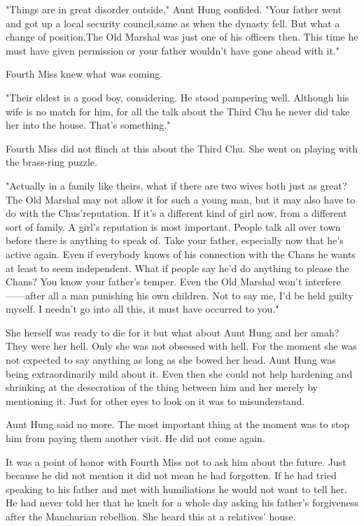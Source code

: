 \par "Things are in great disorder outside," Aunt Hung confided. "Your father went and got up a local security council,same as when the dynasty fell. But what a change of position.The Old Marshal was just one of his officers then. This time he must have given permission or your father wouldn't have gone ahead with it."
\par Fourth Miss knew what was coming.
\par "Their eldest is a good boy, considering. He stood pampering well. Although his wife is no match for him, for all the talk about the Third Chu he never did take her into the house. That's something."
\par Fourth Miss did not flinch at this about the Third Chu. She went on playing with the brass-ring puzzle.
\par "Actually in a family like theirs, what if there are two wives both just as great? The Old Marshal may not allow it for such a young man, but it may also have to do with the Chus'reputation. If it's a different kind of girl now, from a different sort of family. A girl's reputation is most important. People talk all over town before there is anything to speak of. Take your father, especially now that he's active again. Even if everybody knows of his connection with the Chans he wants at least to seem independent. What if people say he'd do anything to please the Chans? You know your father's temper. Even the Old Marshal won't interfere——after all a man punishing his own children. Not to say me, I'd be held guilty myself. I needn't go into all this, it must have occurred to you."
\par She herself was ready to die for it but what about Aunt Hung and her amah? They were her hell. Only she was not obsessed with hell. For the moment she was not expected to say anything as long as she bowed her head. Aunt Hung was being extraordinarily mild about it. Even then she could not help hardening and shrinking at the desecration of the thing between him and her merely by mentioning it. Just for other eyes to look on it was to misunderstand.
\par Aunt Hung said no more. The most important thing at the moment was to stop him from paying them another visit. He did not come again.
\par It was a point of honor with Fourth Miss not to ask him about the future. Just because he did not mention it did not mean he had forgotten. If he had tried speaking to his father and met with humiliations he would not want to tell her. He had never told her that he knelt for a whole day asking his father's forgiveness after the Manchurian rebellion. She heard this at a relatives' house.
